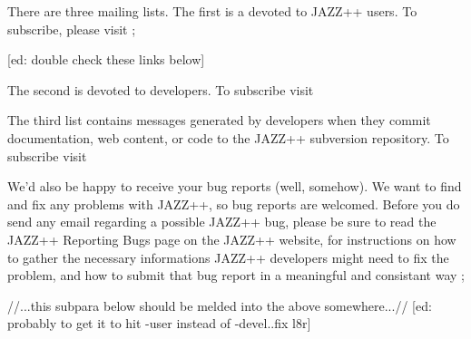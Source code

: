 \documentclass[letterpaper]{report}
\begin{document}
There are three mailing lists.  The first is a devoted to JAZZ++ users.  To
subscribe, please visit ;

 [ed: double check these links below]

\begin{indented}{2cm}
\end{indented}

The second is devoted to developers.  To subscribe visit

\begin{indented}{2cm}
\end{indented}

The third list contains messages generated by developers when they commit
documentation, web content, or code to the JAZZ++ subversion repository.
To subscribe visit

\begin{indented}{2cm}
\end{indented}

We'd also be happy to receive your bug reports (well, somehow). We want to find
and fix any problems with JAZZ++, so bug reports are welcomed. Before you do
send any email regarding a possible JAZZ++ bug, please be sure to read the
JAZZ++ Reporting Bugs page on the JAZZ++ website, for instructions on how
to gather the necessary informations JAZZ++ developers might need to fix the
problem, and how to submit that bug report in a meaningful and consistant way ;

\begin{indented}{2cm}
\end{indented} 


//...this subpara below should be melded into the above somewhere...//
[ed: probably to get it to hit -user instead of -devel..fix l8r]
\end{document}
